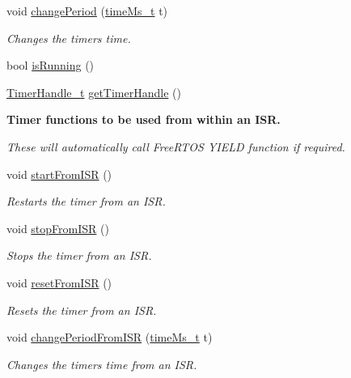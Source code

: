 \begin{DoxyCompactItemize}
void \hyperlink{classFreeRTOSTimer_a90600dc55886fa4a9aebdb14f7d5155c}{change\+Period} (\hyperlink{freertos__timer_8hpp_a62332987634a9d461e934b53ee0e0772}{time\+Ms\+\_\+t} t)
\begin{DoxyCompactList}\small\item\em Changes the timer\textquotesingle{}s time. \end{DoxyCompactList}\item 
bool \hyperlink{classFreeRTOSTimer_afe875ff318f8158660f94f19982f55ae}{is\+Running} ()
\item 
\hyperlink{timers_8h_aae4bf1dce696ab615d5fd073606fd3cb}{Timer\+Handle\+\_\+t} \hyperlink{classFreeRTOSTimer_a52230dd9874e8066e441e2ab64522b2a}{get\+Timer\+Handle} ()
\end{DoxyCompactItemize}
\begin{Indent}{\bf Timer functions to be used from within an I\+SR.}\par
{\em These will automatically call Free\+R\+T\+OS Y\+I\+E\+LD function if required. }\begin{DoxyCompactItemize}
\item 
void \hyperlink{classFreeRTOSTimer_a92b1845cf4973a39c0ac44ee615c8e9f}{start\+From\+I\+SR} ()
\begin{DoxyCompactList}\small\item\em Restarts the timer from an I\+SR. \end{DoxyCompactList}\item 
void \hyperlink{classFreeRTOSTimer_aa3652e193022be79d5c7a31c1bcfaede}{stop\+From\+I\+SR} ()
\begin{DoxyCompactList}\small\item\em Stops the timer from an I\+SR. \end{DoxyCompactList}\item 
void \hyperlink{classFreeRTOSTimer_ab5861a16ffb9d3aa55eefd8432087c8d}{reset\+From\+I\+SR} ()
\begin{DoxyCompactList}\small\item\em Resets the timer from an I\+SR. \end{DoxyCompactList}\item 
void \hyperlink{classFreeRTOSTimer_abbc13f7e4ab40097098152c3bdbd8b8a}{change\+Period\+From\+I\+SR} (\hyperlink{freertos__timer_8hpp_a62332987634a9d461e934b53ee0e0772}{time\+Ms\+\_\+t} t)
\begin{DoxyCompactList}\small\item\em Changes the timer\textquotesingle{}s time from an I\+SR. \end{DoxyCompactList}\end{DoxyCompactItemize}
\end{Indent}


